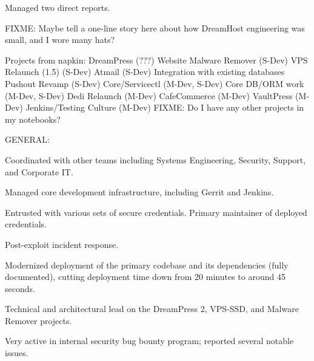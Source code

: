 \item Managed two direct reports.
\item FIXME: Maybe tell a one-line story here about how DreamHost engineering was small, and I wore many hats?
\item Projects from napkin:
  DreamPress                (???)
  Website Malware Remover   (S-Dev)
  VPS Relaunch (1.5)        (S-Dev)
  Atmail                    (S-Dev)
    Integration with existing databases
  Pushout Revamp            (S-Dev)
  Core/Servicectl           (M-Dev, S-Dev)
  Core DB/ORM work          (M-Dev, S-Dev)
  Dedi Relaunch             (M-Dev)
  CafeCommerce              (M-Dev)
  VaultPress                (M-Dev)
  Jenkins/Testing Culture   (M-Dev)
  FIXME: Do I have any other projects in my notebooks?

\item GENERAL:
\item Coordinated with other teams including Systems Engineering, Security, Support, and Corporate IT.
\item Managed core development infrastructure, including Gerrit and Jenkins.
\item Entrusted with various sets of secure credentials. Primary maintainer of deployed credentials.
\item Post-exploit incident response.
\item Modernized deployment of the primary codebase and its dependencies (fully documented), cutting deployment time down from 20 minutes to around 45 seconds.
\item Technical and architectural lead on the DreamPress 2, VPS-SSD, and Malware Remover projects.
\item Very active in internal security bug bounty program; reported several notable issues.
